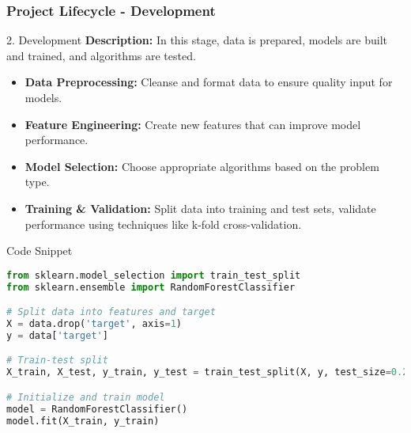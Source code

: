 \documentclass[aspectratio=169]{beamer}
\begin{document}
\begin{frame}[fragile]
    \frametitle{Project Lifecycle - Development}
    \begin{block}{2. Development}
        \textbf{Description:} In this stage, data is prepared, models are built and trained, and algorithms are tested.
        \begin{itemize}
            \item \textbf{Data Preprocessing:} Cleanse and format data to ensure quality input for models.
            \item \textbf{Feature Engineering:} Create new features that can improve model performance.
            \item \textbf{Model Selection:} Choose appropriate algorithms based on the problem type.
            \item \textbf{Training \& Validation:} Split data into training and test sets, validate performance using techniques like k-fold cross-validation.
        \end{itemize}
    \end{block}

    \begin{block}{Code Snippet}
    \begin{lstlisting}[language=Python]
from sklearn.model_selection import train_test_split
from sklearn.ensemble import RandomForestClassifier

# Split data into features and target
X = data.drop('target', axis=1)
y = data['target']

# Train-test split
X_train, X_test, y_train, y_test = train_test_split(X, y, test_size=0.2)

# Initialize and train model
model = RandomForestClassifier()
model.fit(X_train, y_train)
    \end{lstlisting}
    \end{block}
\end{frame}
\end{document}

